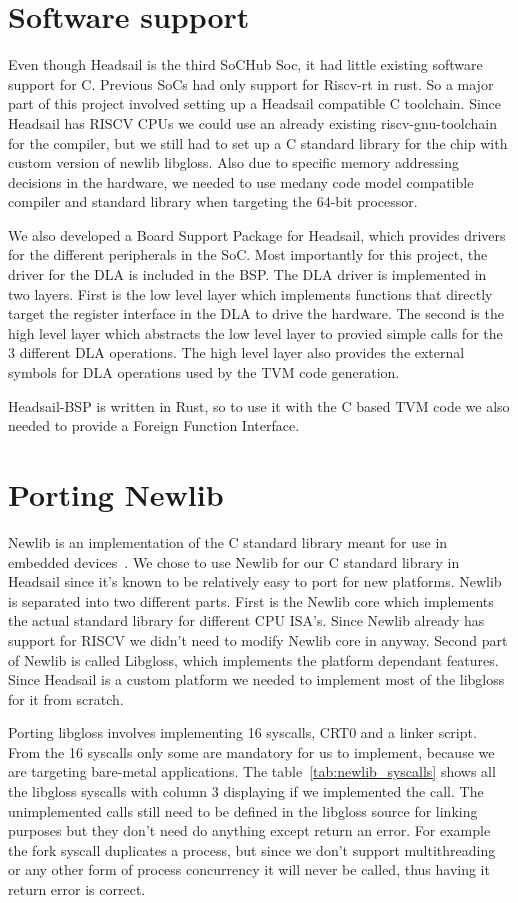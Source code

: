 \documentclass[12pt,a4paper,english
]{tunithesis}
\begin{document}
\section{Software support}
\label{sec:software_support}
Even though Headsail is the third SoCHub Soc, it had little existing software support for C. Previous SoCs had only support for Riscv-rt in rust. So a major part of this project involved setting up a Headsail compatible C toolchain. Since Headsail has RISCV CPUs we could use an already existing riscv-gnu-toolchain for the compiler, but we still had to set up a C standard library for the chip with custom version of newlib libgloss. Also due to specific memory addressing decisions in the hardware, we needed to use medany code model compatible compiler and standard library when targeting the 64-bit processor.

We also developed a Board Support Package for Headsail, which provides drivers for the different peripherals in the SoC. Most importantly for this project, the driver for the DLA is included in the BSP.
The DLA driver is implemented in two layers. First is the low level layer which implements functions that directly target the register interface in the DLA to drive the hardware. The second is the high level layer which abstracts the low level layer to provied simple calls for the 3 different DLA operations. The high level layer also provides the external symbols for DLA operations used by the TVM code generation.

Headsail-BSP is written in Rust, so to use it with the C based TVM code we also needed to provide a Foreign Function Interface.


\section{Porting Newlib}
Newlib is an implementation of the C standard library meant for use in embedded devices~\parencite{newlib}. We chose to use Newlib for our C standard library in Headsail since it's known to be relatively easy to port for new platforms. Newlib is separated into two different parts. First is the Newlib core which implements the actual standard library for different CPU ISA's. Since Newlib already has support for RISCV we didn't need to modify Newlib core in anyway. Second part of Newlib is called Libgloss, which implements the platform dependant features. Since Headsail is a custom platform we needed to implement most of the libgloss for it from scratch.

Porting libgloss involves implementing 16 syscalls, CRT0 and a linker script. From the 16 syscalls only some are mandatory for us to implement, because we are targeting bare-metal applications. The table~\ref{tab:newlib_syscalls} shows all the libgloss syscalls with column 3 displaying if we implemented the call. The unimplemented calls still need to be defined in the libgloss source for linking purposes but they don't need do anything except return an error. For example the fork syscall duplicates a process, but since we don't support multithreading or any other form of process concurrency it will never be called, thus having it return error is correct.
\end{document}

